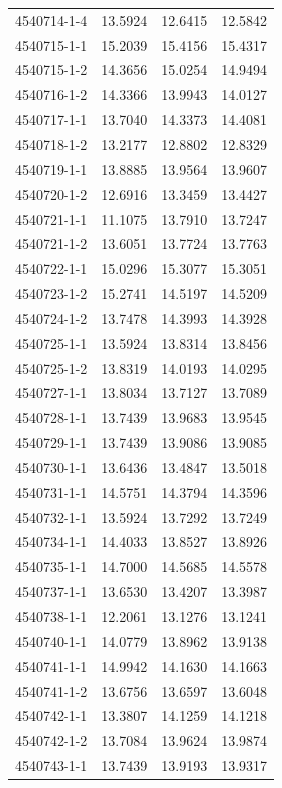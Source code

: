 \begin{longtable}{lrrr}
4540714-1-4 & 13.5924 & 12.6415 & 12.5842 \\
4540715-1-1 & 15.2039 & 15.4156 & 15.4317 \\
4540715-1-2 & 14.3656 & 15.0254 & 14.9494 \\
4540716-1-2 & 14.3366 & 13.9943 & 14.0127 \\
4540717-1-1 & 13.7040 & 14.3373 & 14.4081 \\
4540718-1-2 & 13.2177 & 12.8802 & 12.8329 \\
4540719-1-1 & 13.8885 & 13.9564 & 13.9607 \\
4540720-1-2 & 12.6916 & 13.3459 & 13.4427 \\
4540721-1-1 & 11.1075 & 13.7910 & 13.7247 \\
4540721-1-2 & 13.6051 & 13.7724 & 13.7763 \\
4540722-1-1 & 15.0296 & 15.3077 & 15.3051 \\
4540723-1-2 & 15.2741 & 14.5197 & 14.5209 \\
4540724-1-2 & 13.7478 & 14.3993 & 14.3928 \\
4540725-1-1 & 13.5924 & 13.8314 & 13.8456 \\
4540725-1-2 & 13.8319 & 14.0193 & 14.0295 \\
4540727-1-1 & 13.8034 & 13.7127 & 13.7089 \\
4540728-1-1 & 13.7439 & 13.9683 & 13.9545 \\
4540729-1-1 & 13.7439 & 13.9086 & 13.9085 \\
4540730-1-1 & 13.6436 & 13.4847 & 13.5018 \\
4540731-1-1 & 14.5751 & 14.3794 & 14.3596 \\
4540732-1-1 & 13.5924 & 13.7292 & 13.7249 \\
4540734-1-1 & 14.4033 & 13.8527 & 13.8926 \\
4540735-1-1 & 14.7000 & 14.5685 & 14.5578 \\
4540737-1-1 & 13.6530 & 13.4207 & 13.3987 \\
4540738-1-1 & 12.2061 & 13.1276 & 13.1241 \\
4540740-1-1 & 14.0779 & 13.8962 & 13.9138 \\
4540741-1-1 & 14.9942 & 14.1630 & 14.1663 \\
4540741-1-2 & 13.6756 & 13.6597 & 13.6048 \\
4540742-1-1 & 13.3807 & 14.1259 & 14.1218 \\
4540742-1-2 & 13.7084 & 13.9624 & 13.9874 \\
4540743-1-1 & 13.7439 & 13.9193 & 13.9317 \\

\end{longtable}
